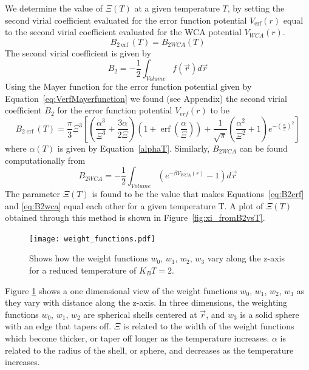 \documentclass[double,12pt]{beavtex}
\begin{document}
We determine the value of $\Xi(T)$ at a given temperature $T$,
by setting the second virial coefficient evaluated for the error 
function potential $V_{\operatorname{erf}}(r)$ equal to the second virial 
coefficient evaluated for the WCA potential $V_{WCA}(r)$.
\begin{equation}B_{2\operatorname{erf}}(T) =B_{2WCA}(T)\end{equation}
The second virial coefficient is given by
\begin{equation}B_2=-\frac{1}{2}\int_{Volume}f(\vec{r})d\vec r\end{equation}
Using the Mayer function for the error function potential given by 
Equation~\ref{eq:VerfMayerfunction} we found (see Appendix) the second 
virial coefficient $B_{2}$ for the error function potential $V_{erf}(r)$ 
to be
\begin{equation} \label{eq:B2erf}
	B_{2\operatorname{erf}}(T) = \frac{\pi}{3}\Xi^3\left[\left(\frac{\alpha^3}{\Xi^3}+\frac{3\alpha}{2\Xi}\right)\left(1+\operatorname{\operatorname{erf}}\left(\frac{\alpha}{\Xi}\right)\right)+\frac{1}{\sqrt{\pi}}\left(\frac{\alpha^2}{\Xi^2}+1\right)e^{-\left(\frac{\alpha}{\Xi}\right)^2}\right]
\end{equation}
where $\alpha(T)$ is given by Equation~\ref{alphaT}. Similarly, 
$B_{2WCA}$ can be found computationally from 
\begin{equation} \label{eq:B2wca}
	B_{2WCA}=-\frac{1}{2}\int_{Volume}\left(e^{-\beta{V}_{WCA}(r)}-1\right)d\vec{r} 
\end{equation}
The parameter $\Xi(T)$ is found to be the value that makes Equations~\ref{eq:B2erf} 
and \ref{eq:B2wca} equal each other for a given temperature T. 
A plot of $\Xi(T)$ obtained through this method is shown in 
Figure~\ref{fig:xi_fromB2vsT}.

\begin{figure}
  \centering
  \texttt{[image: weight\_functions.pdf]}
  \caption{Shows how the weight functions $w_0$, $w_1$, $w_2$, $w_3$ 
  vary along the z-axis for a reduced temperature of $K_BT=2$.}
  \label{fig:weight_functions}
\end{figure}

Figure \ref{fig:weight_functions} shows a one dimensional view of the 
weight functions $w_0$, $w_1$, $w_2$, $w_3$ as they vary with distance 
along the z-axis. In three dimensions, the weighting functions 
$w_0$, $w_1$, $w_2$ are spherical shells centered at $\vec{r}$, 
and $w_3$ is a solid sphere with an edge that tapers off.
$\Xi$ is related to the width of the weight functions which 
become thicker, or taper off longer as the temperature increases. 
$\alpha$ is related to the radius of the shell, or sphere, and decreases 
as the temperature increases.
\end{document}
